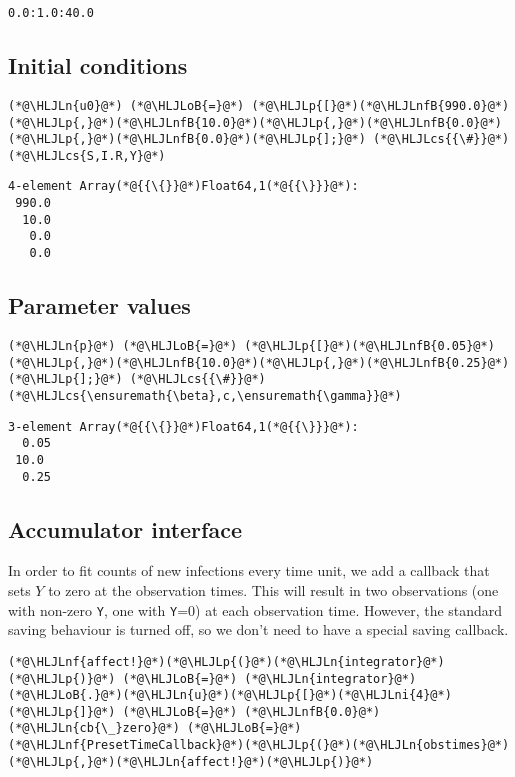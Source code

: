 \documentclass[12pt,a4paper]{article}
\newcommand{\HLJLn}[1]{#1}
\newcommand{\HLJLnf}[1]{\textcolor[RGB]{66,102,213}{#1}}
\newcommand{\HLJLnfB}[1]{\textcolor[RGB]{59,151,46}{#1}}
\newcommand{\HLJLni}[1]{\textcolor[RGB]{59,151,46}{#1}}
\newcommand{\HLJLoB}[1]{\textcolor[RGB]{102,102,102}{\textbf{#1}}}
\newcommand{\HLJLp}[1]{#1}
\newcommand{\HLJLcs}[1]{\textcolor[RGB]{153,153,119}{\textit{#1}}}
\begin{document}
\begin{lstlisting}
0.0:1.0:40.0
\end{lstlisting}


\subsection{Initial conditions}

\begin{lstlisting}
(*@\HLJLn{u0}@*) (*@\HLJLoB{=}@*) (*@\HLJLp{[}@*)(*@\HLJLnfB{990.0}@*)(*@\HLJLp{,}@*)(*@\HLJLnfB{10.0}@*)(*@\HLJLp{,}@*)(*@\HLJLnfB{0.0}@*)(*@\HLJLp{,}@*)(*@\HLJLnfB{0.0}@*)(*@\HLJLp{];}@*) (*@\HLJLcs{{\#}}@*) (*@\HLJLcs{S,I.R,Y}@*)
\end{lstlisting}

\begin{lstlisting}
4-element Array(*@{{\{}}@*)Float64,1(*@{{\}}}@*):
 990.0
  10.0
   0.0
   0.0
\end{lstlisting}


\subsection{Parameter values}

\begin{lstlisting}
(*@\HLJLn{p}@*) (*@\HLJLoB{=}@*) (*@\HLJLp{[}@*)(*@\HLJLnfB{0.05}@*)(*@\HLJLp{,}@*)(*@\HLJLnfB{10.0}@*)(*@\HLJLp{,}@*)(*@\HLJLnfB{0.25}@*)(*@\HLJLp{];}@*) (*@\HLJLcs{{\#}}@*) (*@\HLJLcs{\ensuremath{\beta},c,\ensuremath{\gamma}}@*)
\end{lstlisting}

\begin{lstlisting}
3-element Array(*@{{\{}}@*)Float64,1(*@{{\}}}@*):
  0.05
 10.0
  0.25
\end{lstlisting}


\subsection{Accumulator interface}
In order to fit counts of new infections every time unit, we add a callback that sets $Y$ to zero at the observation times. This will result in two observations (one with non-zero \texttt{Y}, one with \texttt{Y}=0) at each observation time. However, the standard saving behaviour is turned off, so we don't need to have a special saving callback.


\begin{lstlisting}
(*@\HLJLnf{affect!}@*)(*@\HLJLp{(}@*)(*@\HLJLn{integrator}@*)(*@\HLJLp{)}@*) (*@\HLJLoB{=}@*) (*@\HLJLn{integrator}@*)(*@\HLJLoB{.}@*)(*@\HLJLn{u}@*)(*@\HLJLp{[}@*)(*@\HLJLni{4}@*)(*@\HLJLp{]}@*) (*@\HLJLoB{=}@*) (*@\HLJLnfB{0.0}@*)
(*@\HLJLn{cb{\_}zero}@*) (*@\HLJLoB{=}@*) (*@\HLJLnf{PresetTimeCallback}@*)(*@\HLJLp{(}@*)(*@\HLJLn{obstimes}@*)(*@\HLJLp{,}@*)(*@\HLJLn{affect!}@*)(*@\HLJLp{)}@*)
\end{lstlisting}
\end{document}
